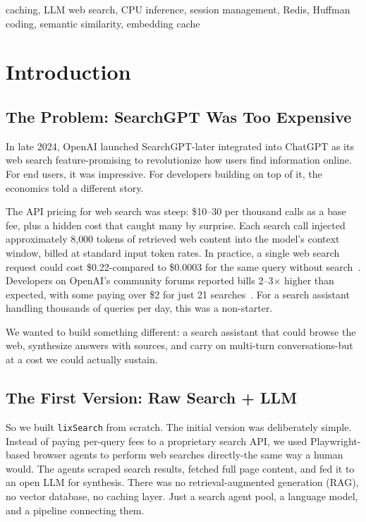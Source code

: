 \documentclass[conference]{IEEEtran}
\begin{document}
\begin{IEEEkeywords}
caching, LLM web search, CPU inference, session management, Redis, Huffman coding, semantic similarity, embedding cache
\end{IEEEkeywords}

\section{Introduction}

\subsection{The Problem: SearchGPT Was Too Expensive}

In late 2024, OpenAI launched SearchGPT-later integrated into ChatGPT as its web search feature-promising to revolutionize how users find information online. For end users, it was impressive. For developers building on top of it, the economics told a different story.

The API pricing for web search was steep: \$10--30 per thousand calls as a base fee, plus a hidden cost that caught many by surprise. Each search call injected approximately 8{,}000 tokens of retrieved web content into the model's context window, billed at standard input token rates. In practice, a single web search request could cost \$0.22-compared to \$0.0003 for the same query without search~\cite{openai_search_pricing}. Developers on OpenAI's community forums reported bills 2--3$\times$ higher than expected, with some paying over \$2 for just 21 searches~\cite{openai_search_billing}. For a search assistant handling thousands of queries per day, this was a non-starter.

We wanted to build something different: a search assistant that could browse the web, synthesize answers with sources, and carry on multi-turn conversations-but at a cost we could actually sustain.

\subsection{The First Version: Raw Search + LLM}

So we built \texttt{lixSearch} from scratch. The initial version was deliberately simple. Instead of paying per-query fees to a proprietary search API, we used Playwright-based browser agents to perform web searches directly-the same way a human would. The agents scraped search results, fetched full page content, and fed it to an open LLM for synthesis. There was no retrieval-augmented generation (RAG), no vector database, no caching layer. Just a search agent pool, a language model, and a pipeline connecting them.
\end{document}
